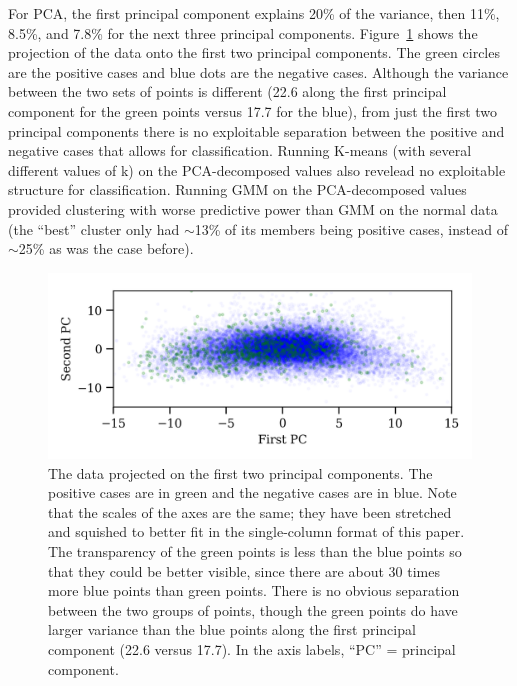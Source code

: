 For PCA, the first principal component explains 20\% of the variance, then 11\%, 8.5\%, and 7.8\% for the next three principal components.  Figure~\ref{pca} shows the projection of the data onto the first two principal components.  The green circles are the positive cases and blue dots are the negative cases.  Although the variance between the two sets of points is different (22.6 along the first principal component for the green points versus 17.7 for the blue), from just the first two principal components there is no exploitable separation between the positive and negative cases that allows for classification.  Running K-means (with several different values of k) on the PCA-decomposed values also revelead no exploitable structure for classification.  Running GMM on the PCA-decomposed values provided clustering with worse predictive power than GMM on the normal data (the ``best'' cluster only had ${\sim}$13\% of its members being positive cases, instead of ${\sim}$25\% as was the case before).
\begin{figure}
\begin{centering}
\includegraphics[width=5in]{pca.png}
\caption{\label{pca} The data projected on the first two principal components.  The positive cases are in green and the negative cases are in blue.  Note that the scales of the axes are the same; they have been stretched and squished to better fit in the single-column format of this paper.  The transparency of the green points is less than the blue points so that they could be better visible, since there are about 30 times more blue points than green points.  There is no obvious separation between the two groups of points, though the green points do have larger variance than the blue points along the first principal component (22.6 versus 17.7).  In the axis labels, ``PC'' = principal component.}
\end{centering}
\end{figure}







